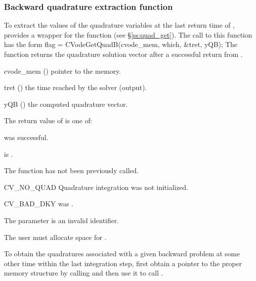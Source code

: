 \subsubsection{Backward quadrature extraction function}
\label{sss:quad_get_b}
To extract the values of the quadrature variables at the last return time
of , {\cvodes} provides a wrapper for the function 
(see \S\ref{ss:quad_get}). The call to this function has the form
{
  flag = CVodeGetQuadB(cvode\_mem, which, \&tret, yQB);
}
{
  The function  returns the quadrature solution vector after
  a successful return from .
}
{
  \begin{args}
  \item[cvode\_mem] ()
    pointer to the {\cvodes} memory.
  \item[tret] ()
    the time reached by the solver (output).
  \item[yQB] ()
    the computed quadrature vector.
  \end{args}
}
{
  The return value  of  is one of:
  \begin{args}
  \item[\Id{CV\_SUCCESS}]
     was successful.
  \item[\Id{CV\_MEM\_NULL}]
     is .
  \item[\Id{CV\_NO\_ADJ}]
    The function  has not been previously called.
  \item[CV\_NO\_QUAD]
    Quadrature integration was not initialized.
  \item[CV\_BAD\_DKY]
     was .
  \item[\Id{CV\_ILL\_INPUT}]
    The parameter  is an invalid identifier.
  \end{args}
}
{
  {\warn}The user must allocate space for .

  To obtain the quadratures associated with a given backward problem at some
  other time within the last integration step, first obtain a pointer to the
  proper {\cvodes} memory structure by calling 
  and then use it to call .
}

